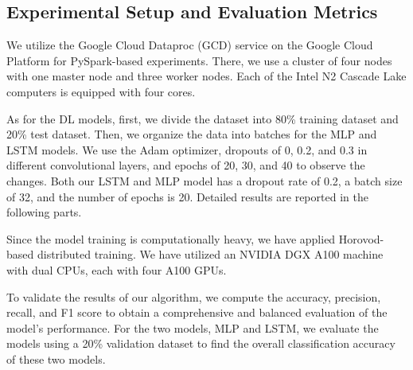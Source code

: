 


\subsection{Experimental Setup and Evaluation Metrics}


We utilize the Google Cloud Dataproc (GCD) service on the Google Cloud Platform for PySpark-based experiments. There, we use a cluster of four nodes with one master node and three worker nodes. Each of the Intel N2 Cascade Lake computers is equipped with four cores.
%

As for the DL models, first, we divide the dataset into 80\% training dataset and 20\% test dataset. Then, we organize the data into batches for the MLP and LSTM models. We use the Adam optimizer, dropouts of 0, 0.2, and 0.3 in different convolutional layers, and epochs of 20, 30, and 40 to observe the changes. Both our LSTM and MLP model has a dropout rate of 0.2, a batch size of 32, and the number of epochs is 20. 
Detailed results are reported in the following parts. 

Since the model training is computationally heavy, we have applied Horovod-based distributed training. We have utilized an NVIDIA DGX A100 machine with dual CPUs, each with four A100 GPUs.

To validate the results of our algorithm, 
    we compute the accuracy, precision, recall, and F1 score to obtain a comprehensive and balanced evaluation of the model's performance.
    For the two models, MLP and LSTM, we evaluate the models using a 20\% validation dataset to find the overall classification accuracy of these two models.  
    
